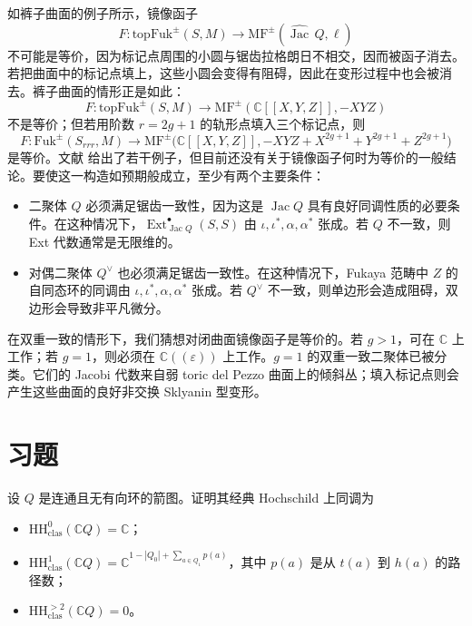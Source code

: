如裤子曲面的例子所示，镜像函子
\[
  F:\mathrm{topFuk}^{\pm}(S,M)\longrightarrow
  \mathrm{MF}^{\pm}(\widehat{\operatorname{Jac}}\,Q,\ell)
\]
不可能是等价，因为标记点周围的小圆与锯齿拉格朗日不相交，因而被函子消去。若把曲面中的标记点填上，这些小圆会变得有阻碍，因此在变形过程中也会被消去。裤子曲面的情形正是如此：
\[
  F:\mathrm{topFuk}^{\pm}(S,M)\to
  \mathrm{MF}^{\pm}(\mathbb C[[X,Y,Z]],-XYZ)
\]
不是等价；但若用阶数 $r=2g+1$ 的轨形点填入三个标记点，则
\[
  F:\mathrm{Fuk}^{\pm}(S_{rrr},M)\to
  \mathrm{MF}^{\pm}\bigl(\mathbb C[[X,Y,Z]],
  -XYZ+X^{2g+1}+Y^{2g+1}+Z^{2g+1}\bigr)
\]
是等价。文献 给出了若干例子，但目前还没有关于镜像函子何时为等价的一般结论。要使这一构造如预期般成立，至少有两个主要条件：
\begin{itemize}
  \item 二聚体 $Q$ 必须满足锯齿一致性，因为这是 $\operatorname{Jac}Q$ 具有良好同调性质的必要条件。在这种情况下，$\operatorname{Ext}^{\bullet}_{\operatorname{Jac}Q}(S,S)$ 由 $\iota,\iota^*,\alpha,\alpha^*$ 张成。若 $Q$ 不一致，则 Ext 代数通常是无限维的。
  \item 对偶二聚体 $Q^{\vee}$ 也必须满足锯齿一致性。在这种情况下，Fukaya 范畴中 $Z$ 的自同态环的同调由 $\iota,\iota^*,\alpha,\alpha^*$ 张成。若 $Q^{\vee}$ 不一致，则单边形会造成阻碍，双边形会导致非平凡微分。
\end{itemize}
在双重一致的情形下，我们猜想对闭曲面镜像函子是等价的。若 $g>1$，可在 $\mathbb C$ 上工作；若 $g=1$，则必须在 $\mathbb C((\varepsilon))$ 上工作。$g=1$ 的双重一致二聚体已被分类。它们的 Jacobi 代数来自弱 toric del Pezzo 曲面上的倾斜丛；填入标记点则会产生这些曲面的良好非交换 Sklyanin 型变形。

\section{习题}\label{sec:deformation-exercises}

\begin{exercise}
设 $Q$ 是连通且无有向环的箭图。证明其经典 Hochschild 上同调为
\begin{itemize}
  \item $\mathrm{HH}^{0}_{\mathrm{clas}}(\mathbb C Q)=\mathbb C$；
  \item $\displaystyle\mathrm{HH}^{1}_{\mathrm{clas}}(\mathbb C Q)
    =\mathbb C^{1-|Q_0|+\sum_{a\in Q_1}p(a)}$，其中 $p(a)$ 是从 $t(a)$ 到 $h(a)$ 的路径数；
  \item $\mathrm{HH}^{>2}_{\mathrm{clas}}(\mathbb C Q)=0$。
\end{itemize}
\end{exercise}

